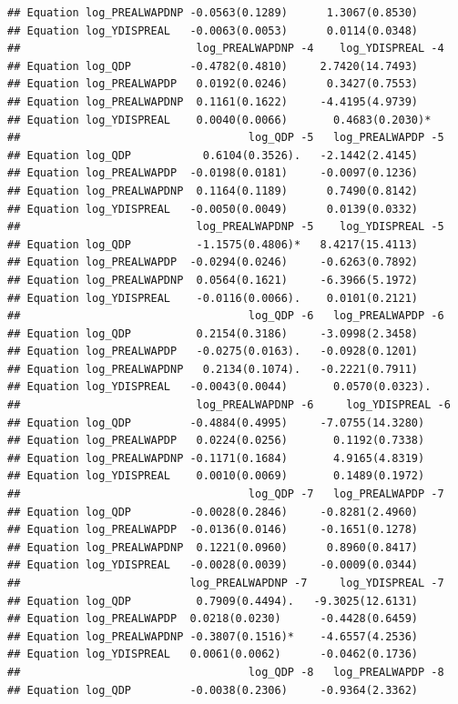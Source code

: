 \documentclass[11pt,preprint, authoryear]{elsarticle}
\numberwithin{equation}{section}
\numberwithin{figure}{section}
\numberwithin{table}{section}
\begin{document}
\begin{verbatim}
## Equation log_PREALWAPDNP -0.0563(0.1289)      1.3067(0.8530)    
## Equation log_YDISPREAL   -0.0063(0.0053)      0.0114(0.0348)    
##                           log_PREALWAPDNP -4    log_YDISPREAL -4
## Equation log_QDP         -0.4782(0.4810)     2.7420(14.7493)    
## Equation log_PREALWAPDP   0.0192(0.0246)      0.3427(0.7553)    
## Equation log_PREALWAPDNP  0.1161(0.1622)     -4.4195(4.9739)    
## Equation log_YDISPREAL    0.0040(0.0066)       0.4683(0.2030)*  
##                                   log_QDP -5   log_PREALWAPDP -5
## Equation log_QDP           0.6104(0.3526).   -2.1442(2.4145)    
## Equation log_PREALWAPDP  -0.0198(0.0181)     -0.0097(0.1236)    
## Equation log_PREALWAPDNP  0.1164(0.1189)      0.7490(0.8142)    
## Equation log_YDISPREAL   -0.0050(0.0049)      0.0139(0.0332)    
##                           log_PREALWAPDNP -5    log_YDISPREAL -5
## Equation log_QDP          -1.1575(0.4806)*   8.4217(15.4113)    
## Equation log_PREALWAPDP  -0.0294(0.0246)     -0.6263(0.7892)    
## Equation log_PREALWAPDNP  0.0564(0.1621)     -6.3966(5.1972)    
## Equation log_YDISPREAL    -0.0116(0.0066).    0.0101(0.2121)    
##                                   log_QDP -6   log_PREALWAPDP -6
## Equation log_QDP          0.2154(0.3186)     -3.0998(2.3458)    
## Equation log_PREALWAPDP   -0.0275(0.0163).   -0.0928(0.1201)    
## Equation log_PREALWAPDNP   0.2134(0.1074).   -0.2221(0.7911)    
## Equation log_YDISPREAL   -0.0043(0.0044)       0.0570(0.0323).  
##                           log_PREALWAPDNP -6     log_YDISPREAL -6
## Equation log_QDP         -0.4884(0.4995)     -7.0755(14.3280)    
## Equation log_PREALWAPDP   0.0224(0.0256)       0.1192(0.7338)    
## Equation log_PREALWAPDNP -0.1171(0.1684)       4.9165(4.8319)    
## Equation log_YDISPREAL    0.0010(0.0069)       0.1489(0.1972)    
##                                   log_QDP -7   log_PREALWAPDP -7
## Equation log_QDP         -0.0028(0.2846)     -0.8281(2.4960)    
## Equation log_PREALWAPDP  -0.0136(0.0146)     -0.1651(0.1278)    
## Equation log_PREALWAPDNP  0.1221(0.0960)      0.8960(0.8417)    
## Equation log_YDISPREAL   -0.0028(0.0039)     -0.0009(0.0344)    
##                          log_PREALWAPDNP -7     log_YDISPREAL -7
## Equation log_QDP          0.7909(0.4494).   -9.3025(12.6131)    
## Equation log_PREALWAPDP  0.0218(0.0230)      -0.4428(0.6459)    
## Equation log_PREALWAPDNP -0.3807(0.1516)*    -4.6557(4.2536)    
## Equation log_YDISPREAL   0.0061(0.0062)      -0.0462(0.1736)    
##                                   log_QDP -8   log_PREALWAPDP -8
## Equation log_QDP         -0.0038(0.2306)     -0.9364(2.3362)    

\end{verbatim}
\end{document}
